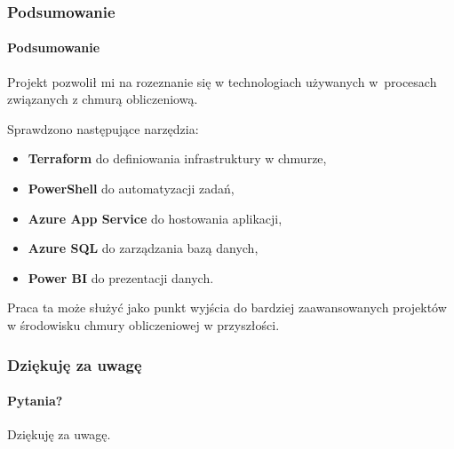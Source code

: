 \documentclass[10pt]{beamer}
\begin{document}
\begin{frame}
	\frametitle{Podsumowanie}
	\framesubtitle{Podsumowanie}
	Projekt pozwolił mi na rozeznanie się w technologiach używanych w~procesach związanych z chmurą obliczeniową. 
	
	\bigskip

	Sprawdzono następujące narzędzia:
	
	\bigskip
	
	\begin{itemize}
		\item \textbf{Terraform} do definiowania infrastruktury w chmurze, 
		\item \textbf{PowerShell} do automatyzacji zadań,
		\item \textbf{Azure App Service} do hostowania aplikacji, 
		\item \textbf{Azure SQL} do zarządzania bazą danych,
		\item \textbf{Power BI} do prezentacji danych.
	\end{itemize}
	
	\bigskip
	
	Praca ta może służyć jako punkt wyjścia do bardziej zaawansowanych projektów w środowisku chmury obliczeniowej w przyszłości.	
\end{frame}

\begin{frame}
	\frametitle{Dziękuję za uwagę}
	\framesubtitle{Pytania?}
	
	\centering
	\huge{Dziękuję za uwagę.}
\end{frame}
\end{document}
